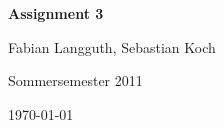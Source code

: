 



% 

\begin{center}
    \huge {\bf Assignment 3}
    
    \small Fabian Langguth, Sebastian Koch
    
    Sommersemester 2011
    
    \today
\end{center}




